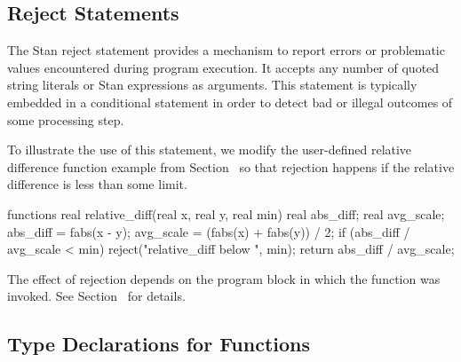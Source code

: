 \subsection{Reject Statements}

The Stan reject statement provides a mechanism to report errors or problematic
values encountered during program execution.
It accepts any number of quoted string literals or Stan expressions as arguments.
This statement is typically embedded in a conditional statement in order to
detect bad or illegal outcomes of some processing step.

To illustrate the use of this statement, we modify the user-defined
relative difference function example from Section~
so that rejection happens if the relative difference is less than
some limit.
%
\begin{stancode}
functions {
  real relative_diff(real x, real y, real min) {
    real abs_diff;
    real avg_scale;
    abs_diff = fabs(x - y);
    avg_scale = (fabs(x) + fabs(y)) / 2;
    if (abs_diff / avg_scale < min) 
      reject("relative_diff below ", min);
    return abs_diff / avg_scale;
  }
}
\end{stancode}

The effect of rejection depends on the program block
in which the function was invoked.
See Section~ for details.

\subsection{Type Declarations for Functions}

